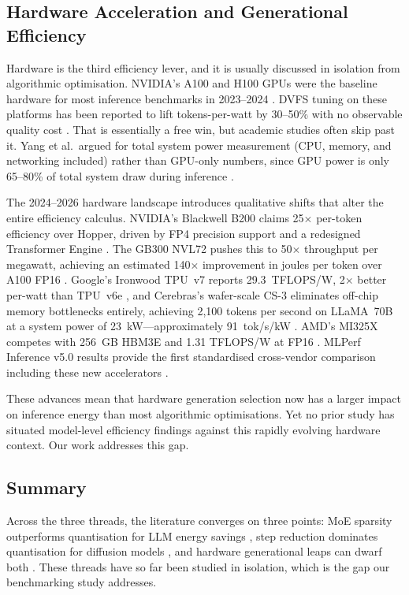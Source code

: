 \documentclass[AMS,STIX2COL]{WileyNJD-v2}
\begin{document}
\subsection{Hardware Acceleration and Generational Efficiency}

Hardware is the third efficiency lever, and it is usually discussed in isolation from algorithmic optimisation. NVIDIA's A100 and H100 GPUs were the baseline hardware for most inference benchmarks in 2023--2024 \cite{nvidia2023a100, nvidia2024h100}. DVFS tuning on these platforms has been reported to lift tokens-per-watt by 30--50\% with no observable quality cost \cite{mei2017dvfs, maliakel2025dvfs}. That is essentially a free win, but academic studies often skip past it. Yang et al.\ argued for total system power measurement (CPU, memory, and networking included) rather than GPU-only numbers, since GPU power is only 65--80\% of total system draw during inference \cite{yang2025system}.

The 2024--2026 hardware landscape introduces qualitative shifts that alter the entire efficiency calculus. NVIDIA's Blackwell B200 claims 25$\times$ per-token efficiency over Hopper, driven by FP4 precision support and a redesigned Transformer Engine \cite{nvidia2024b200}. The GB300 NVL72 pushes this to 50$\times$ throughput per megawatt, achieving an estimated 140$\times$ improvement in joules per token over A100 FP16 \cite{nvidia2025gb300}. Google's Ironwood TPU~v7 reports 29.3~TFLOPS/W, 2$\times$ better per-watt than TPU~v6e \cite{google2025ironwood}, and Cerebras's wafer-scale CS-3 eliminates off-chip memory bottlenecks entirely, achieving 2,100 tokens per second on LLaMA~70B at a system power of 23~kW---approximately 91~tok/s/kW \cite{cerebras2024cs3}. AMD's MI325X competes with 256~GB HBM3E and 1.31 TFLOPS/W at FP16 \cite{amd2024mi325x}. MLPerf Inference v5.0 results provide the first standardised cross-vendor comparison including these new accelerators \cite{mlperf2025inference}.

These advances mean that hardware generation selection now has a larger impact on inference energy than most algorithmic optimisations. Yet no prior study has situated model-level efficiency findings against this rapidly evolving hardware context. Our work addresses this gap.

\subsection{Summary}

Across the three threads, the literature converges on three points: MoE sparsity outperforms quantisation for LLM energy savings \cite{lopez2025moe}, step reduction dominates quantisation for diffusion models \cite{bertazzini2025hidden}, and hardware generational leaps can dwarf both \cite{nvidia2025gb300}. These threads have so far been studied in isolation, which is the gap our benchmarking study addresses.
\end{document}
